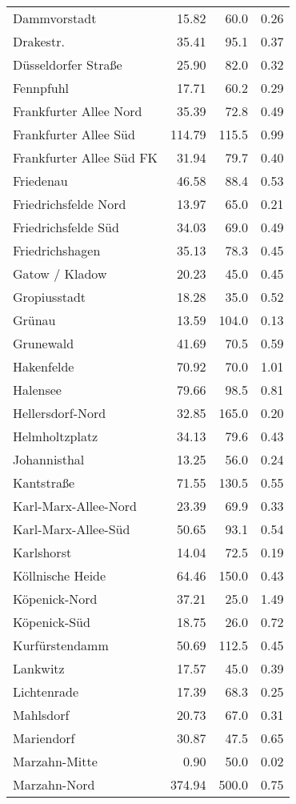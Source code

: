 \begin{tabular}{lrrr}
Dammvorstadt & 15.82 & 60.0 & 0.26\\
Drakestr. & 35.41 & 95.1 & 0.37\\
Düsseldorfer Straße & 25.90 & 82.0 & 0.32\\
Fennpfuhl & 17.71 & 60.2 & 0.29\\
Frankfurter Allee Nord & 35.39 & 72.8 & 0.49\\
Frankfurter Allee Süd & 114.79 & 115.5 & 0.99\\
Frankfurter Allee Süd FK & 31.94 & 79.7 & 0.40\\
Friedenau & 46.58 & 88.4 & 0.53\\
Friedrichsfelde Nord & 13.97 & 65.0 & 0.21\\
Friedrichsfelde Süd & 34.03 & 69.0 & 0.49\\
Friedrichshagen & 35.13 & 78.3 & 0.45\\
Gatow / Kladow & 20.23 & 45.0 & 0.45\\
Gropiusstadt & 18.28 & 35.0 & 0.52\\
Grünau & 13.59 & 104.0 & 0.13\\
Grunewald & 41.69 & 70.5 & 0.59\\
Hakenfelde & 70.92 & 70.0 & 1.01\\
Halensee & 79.66 & 98.5 & 0.81\\
Hellersdorf-Nord & 32.85 & 165.0 & 0.20\\
Helmholtzplatz & 34.13 & 79.6 & 0.43\\
Johannisthal & 13.25 & 56.0 & 0.24\\
Kantstraße & 71.55 & 130.5 & 0.55\\
Karl-Marx-Allee-Nord & 23.39 & 69.9 & 0.33\\
Karl-Marx-Allee-Süd & 50.65 & 93.1 & 0.54\\
Karlshorst & 14.04 & 72.5 & 0.19\\
Köllnische Heide & 64.46 & 150.0 & 0.43\\
Köpenick-Nord & 37.21 & 25.0 & 1.49\\
Köpenick-Süd & 18.75 & 26.0 & 0.72\\
Kurfürstendamm & 50.69 & 112.5 & 0.45\\
Lankwitz & 17.57 & 45.0 & 0.39\\
Lichtenrade & 17.39 & 68.3 & 0.25\\
Mahlsdorf & 20.73 & 67.0 & 0.31\\
Mariendorf & 30.87 & 47.5 & 0.65\\
Marzahn-Mitte & 0.90 & 50.0 & 0.02\\
Marzahn-Nord & 374.94 & 500.0 & 0.75\\

\end{tabular}
